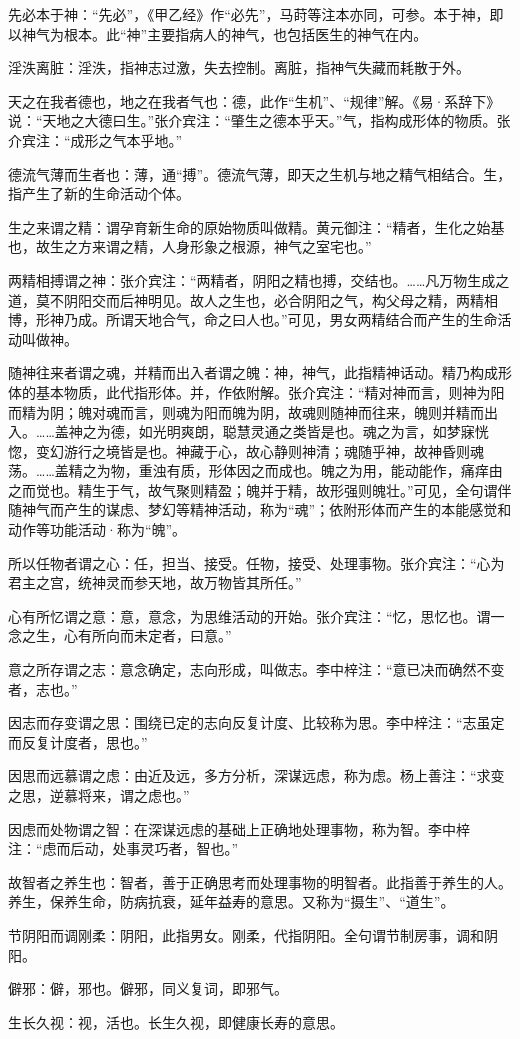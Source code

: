 \documentclass[12pt]{ctexbook}
\begin{document}
\begin{jiaozhu}
  \item 先必本于神：“先必”，《甲乙经》作“必先”，马莳等注本亦同，可参。本于神，即以神气为根本。此“神”主要指病人的神气，也包括医生的神气在内。
  \item 淫泆离脏：淫泆，指神志过激，失去控制。离脏，指神气失藏而耗散于外。
  \item 天之在我者德也，地之在我者气也：德，此作“生机”、“规律”解。《易·系辞下》说：“天地之大德曰生。”张介宾注：“肇生之德本乎天。”气，指构成形体的物质。张介宾注：“成形之气本乎地。”
  \item 德流气薄而生者也：薄，通“搏”。德流气薄，即天之生机与地之精气相结合。生，指产生了新的生命活动个体。
  \item 生之来谓之精：谓孕育新生命的原始物质叫做精。黄元御注：“精者，生化之始基也，故生之方来谓之精，人身形象之根源，神气之室宅也。”
  \item 两精相搏谓之神：张介宾注：“两精者，阴阳之精也搏，交结也。……凡万物生成之道，莫不阴阳交而后神明见。故人之生也，必合阴阳之气，构父母之精，两精相博，形神乃成。所谓天地合气，命之曰人也。”可见，男女两精结合而产生的生命活动叫做神。
  \item 随神往来者谓之魂，并精而出入者谓之魄：神，神气，此指精神话动。精乃构成形体的基本物质，此代指形体。并，作依附解。张介宾注：“精对神而言，则神为阳而精为阴；魄对魂而言，则魂为阳而魄为阴，故魂则随神而往来，魄则并精而出入。……盖神之为德，如光明爽朗，聪慧灵通之类皆是也。魂之为言，如梦寐恍惚，变幻游行之境皆是也。神藏于心，故心静则神清；魂随乎神，故神昏则魂荡。……盖精之为物，重浊有质，形体因之而成也。魄之为用，能动能作，痛痒由之而觉也。精生于气，故气聚则精盈；魄并于精，故形强则魄壮。”可见，全句谓伴随神气而产生的谋虑、梦幻等精神活动，称为“魂”；依附形体而产生的本能感觉和动作等功能活动·称为“魄”。
  \item 所以任物者谓之心：任，担当、接受。任物，接受、处理事物。张介宾注：“心为君主之宫，统神灵而参天地，故万物皆其所任。”
  \item 心有所忆谓之意：意，意念，为思维活动的开始。张介宾注：“忆，思忆也。谓一念之生，心有所向而未定者，曰意。”
  \item 意之所存谓之志：意念确定，志向形成，叫做志。李中梓注：“意已决而确然不变者，志也。”
  \item 因志而存变谓之思：围绕已定的志向反复计度、比较称为思。李中梓注：“志虽定而反复计度者，思也。”
  \item 因思而远慕谓之虑：由近及远，多方分析，深谋远虑，称为虑。杨上善注：“求变之思，逆慕将来，谓之虑也。”
  \item 因虑而处物谓之智：在深谋远虑的基础上正确地处理事物，称为智。李中梓注：“虑而后动，处事灵巧者，智也。”
  \item 故智者之养生也：智者，善于正确思考而处理事物的明智者。此指善于养生的人。养生，保养生命，防病抗衰，延年益寿的意思。又称为“摄生”、“道生”。
  \item 节阴阳而调刚柔：阴阳，此指男女。刚柔，代指阴阳。全句谓节制房事，调和阴阳。
  \item 僻邪：僻，邪也。僻邪，同义复词，即邪气。
  \item 生长久视：视，活也。长生久视，即健康长寿的意思。
\end{jiaozhu}
\end{document}
